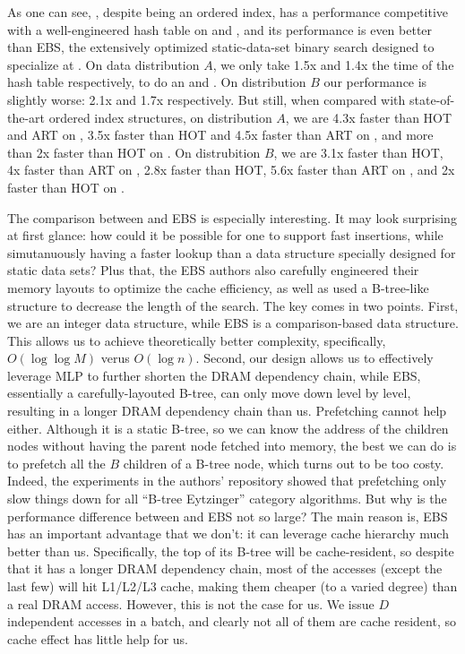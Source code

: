 \documentclass[11pt, usletter]{article}
\begin{document}
As one can see, \MlpIndex, despite being an ordered index, 
has a performance competitive with a well-engineered hash table on \insertion and \lookup, 
and its \lowerbound performance is even better than EBS, 
the extensively optimized static-data-set binary search designed to specialize at \lowerbound.
On data distribution $A$, we only take 1.5x and 1.4x the time of the hash table respectively, to do an \insertion and \lookup. 
On distribution $B$ our performance is slightly worse: 2.1x and 1.7x respectively. 
But still, when compared with state-of-the-art ordered index structures, 
on distribution $A$, we are 4.3x faster than HOT and ART on \insertion, 
3.5x faster than HOT and 4.5x faster than ART on \lookup, 
and more than 2x faster than HOT on \lowerbound. 
On distrubition $B$, we are 3.1x faster than HOT, 4x faster than ART on \insertion, 
2.8x faster than HOT, 5.6x faster than ART on \lookup, 
and 2x faster than HOT on \lowerbound.

The comparison between \MlpIndex and EBS is especially interesting. 
It may look surprising at first glance: how could it be possible for one to support fast insertions, 
while simutanuously having a faster lookup than a data structure specially designed for static data sets?
Plus that, the EBS authors also carefully engineered their memory layouts 
to optimize the cache efficiency, as well as used a B-tree-like structure to decrease the length of the search.
The key comes in two points. First, we are an integer data structure, while EBS is a comparison-based data structure. 
This allows us to achieve theoretically better complexity, specifically, $O(\log\log M)$ verus $O(\log n)$. 
Second, our design allows us to effectively leverage MLP to further shorten the DRAM dependency chain, 
while EBS, essentially a carefully-layouted B-tree, can only move down level by level, 
resulting in a longer DRAM dependency chain than us. 
Prefetching cannot help either.
Although it is a static B-tree, so we can know the address of the children nodes without having 
the parent node fetched into memory, the best we can do is to prefetch all the $B$ children of a B-tree node, 
which turns out to be too costy. Indeed, the experiments in the authors' repository 
showed that prefetching only slow things down for all ``B-tree Eytzinger'' category algorithms.
But why is the performance difference between \MlpIndex and EBS not so large? 
The main reason is, EBS has an important advantage that we don't: it can leverage cache hierarchy much better than us. 
Specifically, the top of its B-tree will be cache-resident, 
so despite that it has a longer DRAM dependency chain, most of the accesses (except the last few) will hit L1/L2/L3 
cache, making them cheaper (to a varied degree) than a real DRAM access. 
However, this is not the case for us. We issue $D$ independent accesses in a batch, 
and clearly not all of them are cache resident, so cache effect has little help for us.
\end{document}
